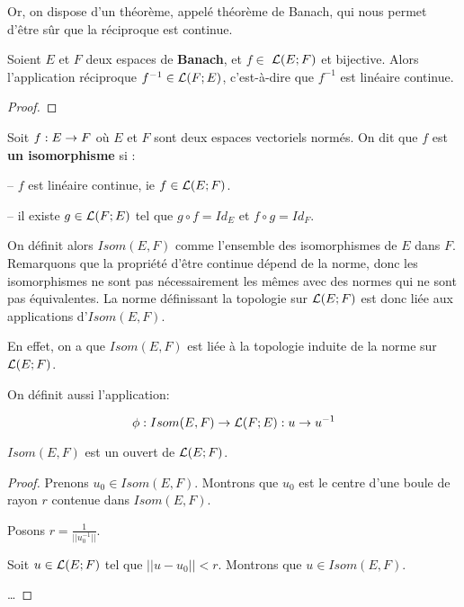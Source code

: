 Or, on dispose d'un théorème, appelé théorème de Banach, qui nous permet d'être
sûr que la réciproque est continue.

\begin{theorem} [Banach]
	\label{theorem_banach_isomorphism}
	Soient $E$ et $F$ deux espaces de \textbf{Banach}, et $f \in$
	$\mathcal{L}(E; F)$ et bijective.
	Alors l'application réciproque $f^{-1} \in \mathcal{L}(F; E)$,
	c'est-à-dire que $f^{-1}$ est linéaire continue.
\end{theorem}

\ifdefined\outputproof
\begin{proof}

\end{proof}
\fi

\begin{definition}
\label{definition_isomorphisme}
	Soit $f : E \rightarrow F$ où $E$ et $F$ sont deux espaces vectoriels
	normés.
	On dit que $f$ est \textbf{un isomorphisme} si :

	-- $f$ est linéaire continue, ie $f \in \mathcal{L}(E; F)$.

	-- il existe $g \in \mathcal{L}(F; E)$ tel que $g \circ f = Id_{E}$ et
	$f \circ g = Id_{F}$.
\end{definition}

On définit alors $Isom(E, F)$ comme l'ensemble des isomorphismes de $E$ dans
$F$.
Remarquons que la propriété d'être continue dépend de la norme, donc les
isomorphismes ne sont pas nécessairement les mêmes avec des normes qui ne sont
pas équivalentes. La norme définissant la topologie sur $\mathcal{L}(E; F)$
est donc liée aux applications d'$Isom(E, F)$.

En effet, on a que $Isom(E, F)$ est liée à la topologie induite de la norme sur
$\mathcal{L}(E; F)$.

On définit aussi l'application:

\begin{equation*}
	\phi : Isom(E, F) \rightarrow \mathcal{L}(F; E) : u \rightarrow u^{-1}
\end{equation*}

\begin{proposition}
	$Isom(E, F)$ est un ouvert de $\mathcal{L}(E; F)$.
\end{proposition}

\ifdefined\outputproof
\begin{proof}
	Prenons $u_{0} \in Isom(E, F)$. Montrons que $u_{0}$ est le centre d'une
	boule de rayon $r$ contenue dans $Isom(E, F)$.

	Posons $r = \frac{1}{||u_{0}^{-1}||}$.

	Soit $u \in \mathcal{L}(E; F)$ tel que $||u - u_{0}|| < r$. Montrons
	que $u \in Isom(E, F)$.

	\ldots
\end{proof}
\fi

